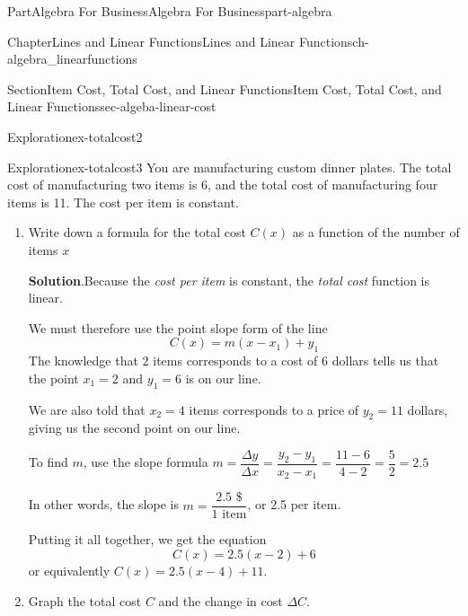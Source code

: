 \documentclass[oneside,10pt,]{tufte-book}
\newcommand{\blocktitlefont}{\relax}
\numberwithin{equation}{chapter}
\def \tikzhistogram (#1,#2){\draw[fill=blue,opacity=0.3] ({#1+((\xtwo-\xmin)/5)},#2) rectangle ({#1-((\xtwo-\xmin)/5)},0); \draw[draw,thick] ({#1+((\xtwo-\xmin)/5)},#2) rectangle ({#1-((\xtwo-\xmin)/5)},0); \node[draw,fill=blue, circle,inner sep=2.5pt] at (#1,#2) {};}
\begin{document}
\begin{partptx}{Part}{Algebra For Business}{}{Algebra For Business}{}{}{part-algebra}
\begin{chapterptx}{Chapter}{Lines and Linear Functions}{}{Lines and Linear Functions}{}{}{ch-algebra_linearfunctions}
\begin{sectionptx}{Section}{Item Cost, Total Cost, and Linear Functions}{}{Item Cost, Total Cost, and Linear Functions}{}{}{sec-algeba-linear-cost}
\begin{exploration}{Exploration}{}{ex-totalcost2}
\begin{enumerate}[font=\bfseries,label=(\alph*),ref=\alph*]
\begin{image}{0}{1}{0}{}
{
}%
\end{image}%
\end{enumerate}%
\end{exploration}%
\begin{exploration}{Exploration}{}{ex-totalcost3}%
You are manufacturing custom dinner plates. The total cost of manufacturing two items is \textdollar{}6, and the total cost of manufacturing four items is \textdollar{}11. The cost per item is constant.%
\begin{enumerate}[font=\bfseries,label=(\alph*),ref=\alph*]%
\item{}Write down a formula for the total cost \(C(x)\) as a function of the number of items \(x\)%
\par\smallskip%
\noindent\textbf{\blocktitlefont Solution}.\hypertarget{ex-totalcost3-2-2}{}\quad{}Because the \emph{cost per item} is constant, the \emph{total cost} function is linear.%
\par
We must therefore use the point slope form of the line%
\begin{equation*}
C(x) = m (x-x_1) + y_1	
\end{equation*}
The knowledge that \(2\) items corresponds to a cost of \(6\) dollars tells us that the point \(x_1=2\) and \(y_1=6\) is on our line.%
\par
We are also told that \(x_2=4\) items corresponds to a price of \(y_2=11\) dollars, giving us the second point on our line.%
\par
To find \(m\), use the slope formula \(m = \dfrac{\Delta y}{\Delta x} = \dfrac{y_2-y_1}{x_2-x_1} = \dfrac{11-6}{4-2}=\dfrac{5}{2}=2.5\)%
\par
In other words, the slope is \(m=\dfrac{2.5 \text{ \$}}{1\text{ item}}\), or 2.5 \textdollar{} per item.%
\par
Putting it all together, we get the equation%
\begin{equation*}
C(x) = 2.5 (x - 2) + 6
\end{equation*}
or equivalently \(C(x) = 2.5 (x - 4) + 11\).%
\item{}Graph the total cost \(C\) and the change in cost \(\Delta C\).%

\end{enumerate}
\end{exploration}
\end{sectionptx}
\end{chapterptx}
\end{partptx}
\end{document}
